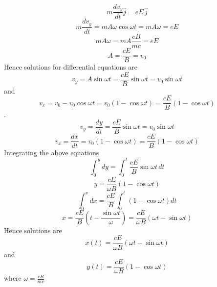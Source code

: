 \documentclass[12pt]{article}
\begin{document}
$$m\frac{dv_y}{dt}\hat{j}=eE\,\hat{j}$$
$$m\frac{dv_y}{dt}=mA\omega\cos{\omega{t}}=mA\omega=eE$$
$$mA\omega=mA\frac{eB}{mc}=eE$$
$$A=\frac{cE}{B}=v_0$$
Hence solutions for differential equations are $$v_y=A\sin{\omega{t}}=\frac{cE}{B}\sin{\omega{t}}=v_0\sin{\omega{t}}$$ and $$v_x=v_0-v_0\cos{\omega{t}}=v_0(1-\cos{\omega{t}})=\frac{cE}{B}(1-\cos{\omega{t}})$$.
$$v_y=\frac{dy}{dt}=\frac{cE}{B}\sin{\omega{t}}=v_0\sin{\omega{t}}$$
$$v_x=\frac{dx}{dt}=v_0(1-\cos{\omega{t}})=\frac{cE}{B}(1-\cos{\omega{t}})$$
Integrating the above equations
$$\int_{0}^{y}dy=\int_{0}^{t}\frac{cE}{B}\sin{\omega{t}}\,dt$$
$$y=\frac{cE}{\omega{B}}(1-\cos{\omega{t}})$$
$$\int_{0}^{x}dx=\frac{cE}{B}\int_{0}^{t}(1-\cos{\omega{t}})dt$$
$$x=\frac{cE}{B}\left(t-\frac{\sin{\omega{t}}}{\omega}\right)=\frac{cE}{\omega{B}}\left(\omega{t}-\sin{\omega{t}}\right)$$
Hence solutions are $$\boxed{x(t)=\frac{cE}{\omega B}\left(\omega{t}-\sin{\omega{t}}\right)}$$ and 
\[\boxed{y(t)=\frac{cE}{\omega B}(1-\cos{\omega{t}})}\]
 where $\omega=\frac{eB}{mc}$
\end{document}

